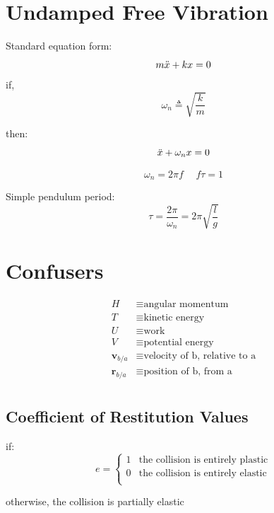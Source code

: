 \documentclass[twocolumn, 12pt]{article}
\begin{document}
\section*{Undamped Free Vibration}
Standard equation form:
\begin{equation*}
    m \Ddot{x}+kx=0 
\end{equation*}
\noindent
if,
\begin{equation*}
    \omega_n \triangleq \sqrt{\frac{k}{m}}
\end{equation*}

\noindent
then:
\begin{equation*}
    \Ddot{x}+\omega_nx=0
\end{equation*}

\begin{equation*}
    \omega_n=2\pi f \hspace{15pt} f\tau=1
\end{equation*}

\noindent
Simple pendulum period:
\begin{equation*}
    \tau=\frac{2\pi}{\omega_n}=2\pi \sqrt{\frac{l}{g}} 
\end{equation*}

\section*{Confusers}
\begin{center}
\begin{align*}
    H &\equiv \text{angular momentum}\\
    T &\equiv \text{kinetic energy}\\
    U &\equiv \text{work}\\
    V &\equiv  \text{potential energy}\\
    \textbf{v}_{b/a}&\equiv \text{velocity of b, relative to a}\\
    \textbf{r}_{b/a} &\equiv \text{position of b, from a} \\
\end{align*}
\end{center}
\subsection*{Coefficient of Restitution Values}

\noindent
if:
\[
e=
\begin{cases}
1  &\text{the collision is entirely plastic}\\
0 &\text{the collision is entirely elastic}\\
\end{cases}
\]
\begin{center}
    otherwise, the collision is partially elastic
\end{center}
\end{document}

